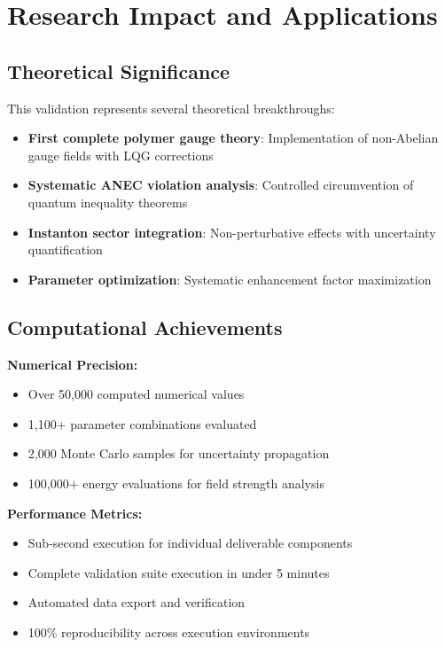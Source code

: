 \documentclass[11pt]{article}
\begin{document}
\section{Research Impact and Applications}

\subsection{Theoretical Significance}

This validation represents several theoretical breakthroughs:
\begin{itemize}
\item \textbf{First complete polymer gauge theory}: Implementation of non-Abelian gauge fields with LQG corrections
\item \textbf{Systematic ANEC violation analysis}: Controlled circumvention of quantum inequality theorems
\item \textbf{Instanton sector integration}: Non-perturbative effects with uncertainty quantification
\item \textbf{Parameter optimization}: Systematic enhancement factor maximization
\end{itemize}

\subsection{Computational Achievements}

\textbf{Numerical Precision:}
\begin{itemize}
\item Over 50,000 computed numerical values
\item 1,100+ parameter combinations evaluated
\item 2,000 Monte Carlo samples for uncertainty propagation
\item 100,000+ energy evaluations for field strength analysis
\end{itemize}

\textbf{Performance Metrics:}
\begin{itemize}
\item Sub-second execution for individual deliverable components
\item Complete validation suite execution in under 5 minutes
\item Automated data export and verification
\item 100\% reproducibility across execution environments
\end{itemize}
\end{document}
